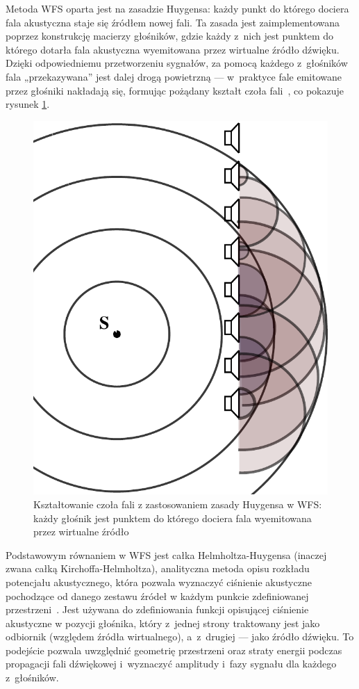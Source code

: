 \documentclass[12pt]{oska}
\begin{document}
Metoda WFS oparta jest na zasadzie Huygensa: każdy punkt do którego dociera
fala akustyczna staje się źródłem nowej fali. Ta zasada jest zaimplementowana
poprzez konstrukcję macierzy głośników, gdzie każdy z~nich jest punktem do
którego dotarła fala akustyczna wyemitowana przez wirtualne źródło dźwięku.
Dzięki odpowiedniemu przetworzeniu sygnałów, za pomocą każdego z~głośników fala
„przekazywana” jest dalej drogą powietrzną --- w~praktyce fale emitowane przez
głośniki nakładają się, formując pożądany kształt czoła
fali~\cite{hq_rendering}, co pokazuje rysunek
\ref{r:Huygens}.

\begin{figure}[!tbh]
  \centering
  \includegraphics[scale=.4]{vecgraphics/WFS_idea.pdf}
  \caption{Kształtowanie czoła fali z zastosowaniem zasady Huygensa w WFS: każdy głośnik jest punktem do
  którego dociera fala wyemitowana przez wirtualne źródło}
  \label{r:Huygens}
\end{figure}

Podstawowym równaniem w WFS jest całka Helmholtza-Huygensa (inaczej zwana całką
Kirchoffa-Helmholtza), analityczna metoda opisu rozkładu potencjału akustycznego,
która pozwala wyznaczyć ciśnienie akustyczne pochodzące od danego zestawu
źródeł w każdym punkcie zdefiniowanej przestrzeni~\cite{snaka}. Jest używana do
zdefiniowania funkcji opisującej ciśnienie akustyczne w pozycji głośnika, który
z~jednej strony traktowany jest jako odbiornik (względem źródła wirtualnego),
a~z~drugiej --- jako źródło dźwięku. To podejście pozwala uwzględnić geometrię
przestrzeni oraz straty energii podczas propagacji fali dźwiękowej i~wyznaczyć
amplitudy i~fazy sygnału dla każdego z~głośników. 
\end{document}
